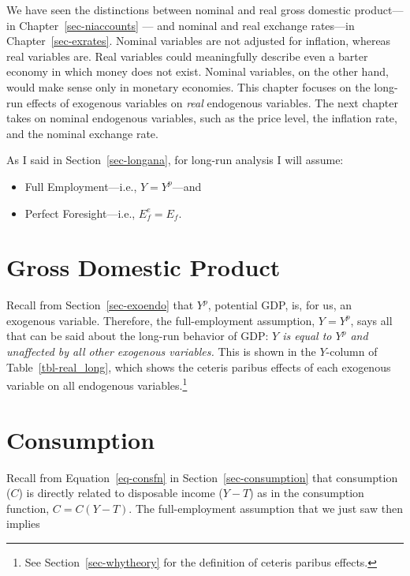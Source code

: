 \documentclass[
  letterpaper,
]{book}
\providecommand{\tightlist}{%
  \setlength{\itemsep}{0pt}\setlength{\parskip}{0pt}}\usepackage{longtable,booktabs,array}
\theoremstyle{plain}
\theoremstyle{remark}
\begin{document}
We have seen the distinctions between nominal and real gross domestic
product--- in Chapter~\ref{sec-niaccounts} --- and nominal and real
exchange rates---in Chapter~\ref{sec-exrates}. Nominal variables are not
adjusted for inflation, whereas real variables are. Real variables could
meaningfully describe even a barter economy in which money does not
exist. Nominal variables, on the other hand, would make sense only in
monetary economies. This chapter focuses on the long-run effects of
exogenous variables on \emph{real} endogenous variables. The next
chapter takes on nominal endogenous variables, such as the price level,
the inflation rate, and the nominal exchange rate.

As I said in Section~\ref{sec-longana}, for long-run
analysis I will assume:

\begin{itemize}
\tightlist
\item
  Full Employment---i.e., \(Y = Y^p\)---and
\item
  Perfect Foresight---i.e., \(E^e_f=E_f\).
\end{itemize}

\section{Gross Domestic Product}\label{sec-longy}

Recall from Section~\ref{sec-exoendo} that \(Y^p\), potential GDP, is,
for us, an exogenous variable. Therefore, the full-employment
assumption, \(Y=Y^p\), says all that can be said about the long-run
behavior of GDP: \emph{\(Y\) is equal to \(Y^p\) and unaffected by all
other exogenous variables.} This is shown in the \(Y\)-column of
Table~\ref{tbl-real_long}, which shows the ceteris paribus effects of
each exogenous variable on all endogenous variables.\footnote{See
  Section~\ref{sec-whytheory} for the definition of ceteris paribus
  effects.}

\section{Consumption}\label{sec-longc}

Recall from Equation~\ref{eq-consfn} in Section~\ref{sec-consumption}
that consumption (\(C\)) is directly related to disposable income
(\(Y-T\)) as in the consumption function, \(C=C(Y-T)\). The
full-employment assumption that we just saw then implies
\end{document}
